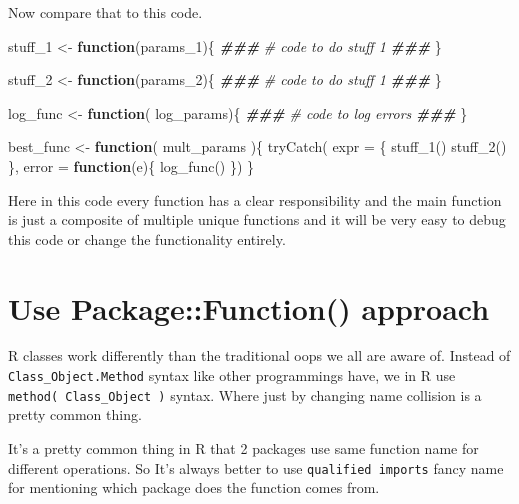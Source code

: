 \documentclass[
]{book}
\newenvironment{Shaded}{\begin{snugshade}}{\end{snugshade}}
\newcommand{\AttributeTok}[1]{\textcolor[rgb]{0.77,0.63,0.00}{#1}}
\newcommand{\CommentTok}[1]{\textcolor[rgb]{0.56,0.35,0.01}{\textit{#1}}}
\newcommand{\ControlFlowTok}[1]{\textcolor[rgb]{0.13,0.29,0.53}{\textbf{#1}}}
\newcommand{\DocumentationTok}[1]{\textcolor[rgb]{0.56,0.35,0.01}{\textbf{\textit{#1}}}}
\newcommand{\FunctionTok}[1]{\textcolor[rgb]{0.00,0.00,0.00}{#1}}
\newcommand{\NormalTok}[1]{#1}
\newcommand{\OtherTok}[1]{\textcolor[rgb]{0.56,0.35,0.01}{#1}}
\begin{document}
Now compare that to this code.

\begin{Shaded}
\begin{Highlighting}[]
\NormalTok{stuff\_1 }\OtherTok{\textless{}{-}} \ControlFlowTok{function}\NormalTok{(params\_1)\{}
  \DocumentationTok{\#\#\#}
  \CommentTok{\# code to do stuff 1}
  \DocumentationTok{\#\#\#}
\NormalTok{\}}

\NormalTok{stuff\_2 }\OtherTok{\textless{}{-}} \ControlFlowTok{function}\NormalTok{(params\_2)\{}
  \DocumentationTok{\#\#\#}
  \CommentTok{\# code to do stuff 1}
  \DocumentationTok{\#\#\#}
\NormalTok{\}}

\NormalTok{log\_func }\OtherTok{\textless{}{-}} \ControlFlowTok{function}\NormalTok{( log\_params)\{}
  \DocumentationTok{\#\#\#}
  \CommentTok{\# code to log errors}
  \DocumentationTok{\#\#\#}
\NormalTok{\}}

\NormalTok{best\_func }\OtherTok{\textless{}{-}} \ControlFlowTok{function}\NormalTok{( mult\_params )\{}
  \FunctionTok{tryCatch}\NormalTok{(}
    \AttributeTok{expr =}\NormalTok{ \{}
    \FunctionTok{stuff\_1}\NormalTok{()}
    \FunctionTok{stuff\_2}\NormalTok{()}
\NormalTok{    \},}
    \AttributeTok{error =} \ControlFlowTok{function}\NormalTok{(e)\{}
    \FunctionTok{log\_func}\NormalTok{()}
\NormalTok{    \})}
\NormalTok{\}}
\end{Highlighting}
\end{Shaded}

Here in this code every function has a clear responsibility and the main function is just a composite of multiple unique functions and it will be very easy to debug this code or change the functionality entirely.

\hypertarget{use-packagefunction-approach}{%
\section{Use Package::Function() approach}\label{use-packagefunction-approach}}

R classes work differently than the traditional oops we all are aware of. Instead of \texttt{Class\_Object.Method} syntax like other programmings have, we in R use \texttt{method(\ Class\_Object\ )} syntax. Where just by changing name collision is a pretty common thing.

It's a pretty common thing in R that 2 packages use same function name for different operations. So It's always better to use \texttt{qualified\ imports} fancy name for mentioning which package does the function comes from.
\end{document}
